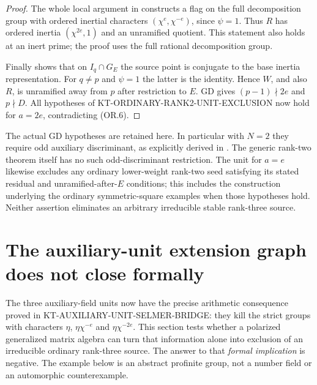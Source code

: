 \documentclass[11pt,a4paper]{article}
\theoremstyle{definition}
\begin{document}
\begin{proof}
The whole local argument in
constructs a flag on the full decomposition group
with ordered inertial characters
$(\chi^e,\chi^{-e})$, since $\psi=1$.
Thus $R$ has ordered inertia $(\chi^{2e},1)$
and an unramified quotient.  This statement
also holds at an inert prime; the proof uses
the full rational decomposition group.

Finally 
shows that on $I_q\cap G_E$ the source point is
conjugate to the base inertia representation.
For $q\ne p$ and $\psi=1$ the latter is the
identity.  Hence $W$, and also $R$, is
unramified away from $p$ after restriction to
$E$.  GD gives $(p-1)\nmid2e$ and $p\nmid D$.
All hypotheses of
KT-ORDINARY-RANK2-UNIT-EXCLUSION now hold for
$a=2e$, contradicting (OR.6).
\end{proof}

The actual GD hypotheses are retained here.  In
particular with $N=2$ they require odd auxiliary
discriminant, as explicitly derived in
.
The generic rank-two theorem itself has no such
odd-discriminant restriction.  The unit for $a=e$
likewise excludes any ordinary lower-weight
rank-two seed satisfying its stated residual
and unramified-after-$E$ conditions; this includes
the construction underlying the ordinary
symmetric-square examples when those hypotheses
hold.  Neither assertion eliminates an arbitrary
irreducible stable rank-three source.



\section{The auxiliary-unit extension graph does not close formally}
\label{sec:kt-polarized-extension-graph}

The three auxiliary-field units now have the precise
arithmetic consequence proved in
KT-AUXILIARY-UNIT-SELMER-BRIDGE: they kill the strict
groups with characters $\eta$, $\eta\chi^{-e}$ and
$\eta\chi^{-2e}$.  This section tests whether a
polarized generalized matrix algebra can turn that
information alone into exclusion of an irreducible
ordinary rank-three source.  The answer to that
\emph{formal implication} is negative.  The example
below is an abstract profinite group, not a number
field or an automorphic counterexample.
\end{document}
